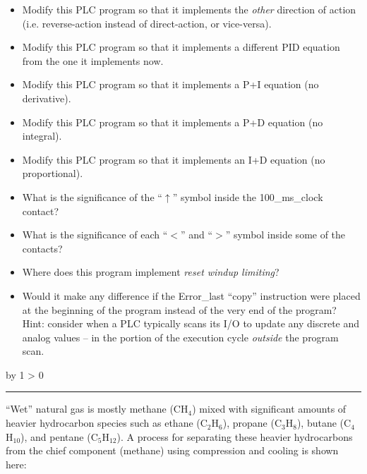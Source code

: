 \documentclass[12pt,a4paper]{article}
\def\oppgave{
            \advance\questnum by 1
            \ifnum \questnum > 0
                 \hrule
                 \vskip 3pt
                 \leftline{Oppgave \the\questnum}
                 \vskip 3pt \fi}
\begin{document}
\begin{itemize}
\item{} Modify this PLC program so that it implements the {\it other} direction of action (i.e. reverse-action instead of direct-action, or vice-versa).
\item{} Modify this PLC program so that it implements a different PID equation from the one it implements now.
\item{} Modify this PLC program so that it implements a P+I equation (no derivative).
\item{} Modify this PLC program so that it implements a P+D equation (no integral).
\item{} Modify this PLC program so that it implements an I+D equation (no proportional).
\item{} What is the significance of the ``$\uparrow$'' symbol inside the 100\_ms\_clock contact?
\item{} What is the significance of each ``$<$'' and ``$>$'' symbol inside some of the contacts?
\item{} Where does this program implement {\it reset windup limiting}?
\item{} Would it make any difference if the Error\_last ``copy'' instruction were placed at the beginning of the program instead of the very end of the program?  Hint: consider when a PLC typically scans its I/O to update any discrete and analog values -- in the portion of the execution cycle {\it outside} the program scan.
\end{itemize}

\vskip 10pt \filbreak 
\oppgave{} 

``Wet'' natural gas is mostly methane (CH$_{4}$) mixed with significant amounts of heavier hydrocarbon species such as ethane (C$_{2}$H$_{6}$), propane (C$_{3}$H$_{8}$), butane (C$_{4}$H$_{10}$), and pentane (C$_{5}$H$_{12}$).  A process for separating these heavier hydrocarbons from the chief component (methane) using compression and cooling is shown here:
\end{document}
